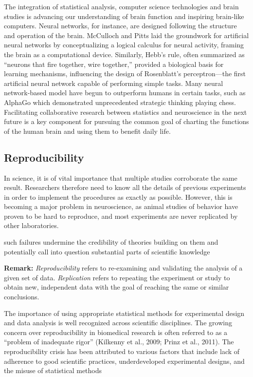 \documentclass[
]{article}
\begin{document}
The integration of statistical analysis, computer science technologies
and brain studies is advancing our understanding of brain function and
inspiring brain-like computers. Neural networks, for instance, are
designed following the structure and operation of the brain. McCulloch
and Pitts laid the groundwork for artificial neural networks by
conceptualizing a logical calculus for neural activity, framing the
brain as a computational device. Similarly, Hebb's rule, often
summarized as ``neurons that fire together, wire together,'' provided a
biological basis for learning mechanisms, influencing the design of
Rosenblatt's perceptron---the first artificial neural network capable of
performing simple tasks. Many neural network-based model have begun to
outperform humans in certain tasks, such as AlphaGo which demonstrated
unprecedented strategic thinking playing chess. Facilitating
collaborative research between statistics and neuroscience in the next
future is a key component for pursuing the common goal of charting the
functions of the human brain and using them to benefit daily life.

\hypertarget{reproducibility}{%
\subsection{Reproducibility}\label{reproducibility}}

In science, it is of vital importance that multiple studies corroborate
the same result. Researchers therefore need to know all the details of
previous experiments in order to implement the procedures as exactly as
possible. However, this is becoming a major problem in neuroscience, as
animal studies of behavior have proven to be hard to reproduce, and most
experiments are never replicated by other laboratories.

such failures undermine the credibility of theories building on them and
potentially call into question substantial parts of scientific knowledge

\textbf{Remark:} \emph{Reproducibility} refers to re-examining and
validating the analysis of a given set of data. \emph{Replication}
refers to repeating the experiment or study to obtain new, independent
data with the goal of reaching the same or similar conclusions.

The importance of using appropriate statistical methods for experimental
design and data analysis is well recognized across scientific
disciplines. The growing concern over reproducibility in biomedical
research is often referred to as a ``problem of inadequate rigor''
(Kilkenny et al., 2009; Prinz et al., 2011). The reproducibility crisis
has been attributed to various factors that include lack of adherence to
good scientific practices, underdeveloped experimental designs, and the
misuse of statistical methods
\end{document}
